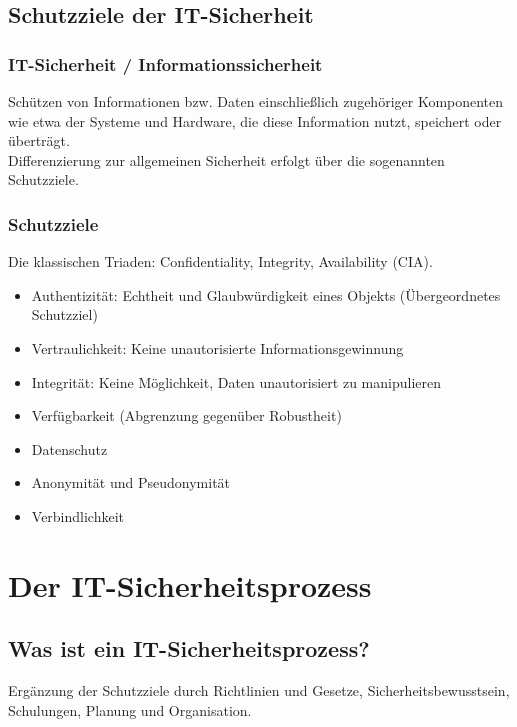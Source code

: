 \subsection{Schutzziele der IT-Sicherheit}

\subsubsection{IT-Sicherheit / Informationssicherheit}
Schützen von Informationen bzw. Daten einschließlich zugehöriger Komponenten wie etwa der Systeme und Hardware, die diese Information nutzt, speichert oder überträgt.\\
Differenzierung zur allgemeinen Sicherheit erfolgt über die sogenannten Schutzziele.

\subsubsection{Schutzziele}

Die klassischen Triaden: Confidentiality, Integrity, Availability (CIA).

\begin{itemize}
	\item Authentizität: Echtheit und Glaubwürdigkeit eines Objekts (Übergeordnetes Schutzziel)
	\item Vertraulichkeit: Keine unautorisierte Informationsgewinnung
	\item Integrität: Keine Möglichkeit, Daten unautorisiert zu manipulieren
	\item Verfügbarkeit (Abgrenzung gegenüber Robustheit)
	\item Datenschutz
	\item Anonymität und Pseudonymität
	\item Verbindlichkeit
\end{itemize}



\section{Der IT-Sicherheitsprozess}

\subsection{Was ist ein IT-Sicherheitsprozess?}

Ergänzung der Schutzziele durch Richtlinien und Gesetze, Sicherheitsbewusstsein, Schulungen, Planung und Organisation.

